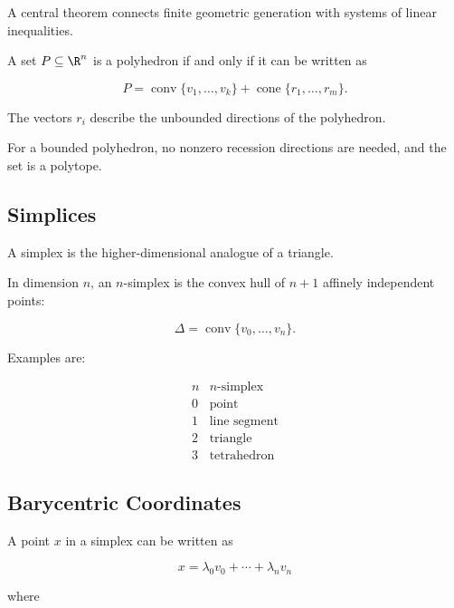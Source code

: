 A central theorem connects finite geometric generation with systems of
linear inequalities.

\begin{theorem}
A set \(P\subseteq\R^n\) is a polyhedron if and only if it can be written as

\[
\boxed{
P=
\operatorname{conv}\{v_1,\ldots,v_k\}
+
\operatorname{cone}\{r_1,\ldots,r_m\}.
}
\]
\end{theorem}

The vectors \(r_i\) describe the unbounded directions of the polyhedron.

For a bounded polyhedron, no nonzero recession directions are needed, and
the set is a polytope.

\subsection{Simplices}
\label{subsec:convex-simplices}

A simplex is the higher-dimensional analogue of a triangle.

In dimension \(n\), an \(n\)-simplex is the convex hull of \(n+1\) affinely
independent points:

\[
\boxed{
\Delta
=
\operatorname{conv}
\{v_0,\ldots,v_n\}.
}
\]

Examples are:

\[
\begin{array}{c|c}
n & n\text{-simplex}\\
\hline
0 & \text{point}\\
1 & \text{line segment}\\
2 & \text{triangle}\\
3 & \text{tetrahedron}
\end{array}
\]

\subsection{Barycentric Coordinates}
\label{subsec:convex-barycentric-coordinates}

A point \(x\) in a simplex can be written as

\[
\boxed{
x=
\lambda_0v_0+\cdots+\lambda_nv_n
}
\]

where

